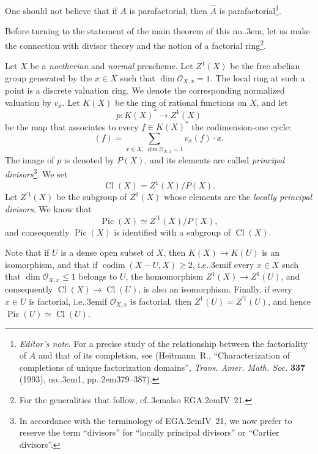 \documentclass[11pt,a4paper,oneside]{book}
\providecommand{\sisi}[2]{#2}
\providecommand{\pageoriginale}{%
  \refstepcounter{pageoriginal}%
  \marginpar{\raggedright\footnotesize\bfseries\thepageoriginal}%
  \xspace}
\providecommand{\nde}[1]{\footnote{\textit{Editor's note.} #1}}
\providecommand{\sfootnote}[1]{\footnote{#1}}
\providecommand{\og}{``}
\providecommand{\fg}{''\xspace}
\providecommand{\cf}{cf.\kern.3em}
\providecommand{\ie}{i.e.\kern.3em}
\providecommand{\EGA}{\textup{EGA}\kern.2em}
\providecommand{\ptbl}{.\kern.2em}
\providecommand{\numero}{no.\kern.3em}
\providecommand{\no}{no.\kern.3em}
\providecommand{\quoi}{}
\providecommand{\OXx}{\mathcal O_{X,x}}
\providecommand{\Pic}{\operatorname{Pic}}
\providecommand{\Cl}{\operatorname{Cl}}
\providecommand{\codim}{\operatorname{codim}}
\providecommand{\danger}{\marginpar{\Large$\triangle$}}
\theoremstyle{plain}
\theoremstyle{definition}
\theoremstyle{remark}
\begin{document}
One should not believe that if $A$ is parafactorial, then $\hat A$ is parafactorial\nde{For a precise study of the relationship between the factoriality of $A$ and that of its completion, see (Heitmann~R., {\og Characterization of completions of unique factorization domains\fg}, \emph{Trans. Amer. Math. Soc.} \textbf{337} (1993), \numero 1, pp\ptbl 379--387).}.

\danger

Before turning to the statement of the main theorem of this \no, let us make the connection with divisor theory and the notion of a factorial ring\sfootnote{For the generalities that follow, \cf also \EGA IV~21.}.

Let $X$ be a \emph{noetherian} and \emph{normal} prescheme. Let $Z^1(X)$ be the free abelian group generated by the $x\in X$ such that $\dim\OXx=1$. The local ring at such a point is a discrete valuation ring. We denote the corresponding normalized valuation by $v_x$. Let $K(X)$ be the ring of rational functions on $X$, and let
\[
p\colon K(X)^*\to Z^1(X)
\]
be the map that associates to every $f\in K(X)^*$ the codimension-one cycle:
\[
(f) = \sum_{x\in X, \;\dim\OXx=1} v_x(f)\cdot x{\quoi}.
\]
The image\pageoriginale of $p$ is denoted by $P(X)$, and its elements are called \emph{principal divisors}\sfootnote{In accordance with the terminology of \EGA IV~21, we now prefer to reserve the term \og divisors\fg for \og locally principal divisors\fg or \og Cartier divisors\fg.}. We set
\[
\Cl(X) = Z^1(X)/P(X){\quoi}.
\]
Let $\sisi{Z}{Z^{\prime1}(X)}$ be the subgroup of $Z^1(X)$ whose elements are the \emph{locally principal divisors}. We know that
\[
\Pic(X)\simeq Z^{\prime1}(X)/P(X){\quoi},
\]
and consequently $\Pic(X)$ is identified with a subgroup of $\Cl(X)$.

Note that if $U$ is a dense open subset of $X$, then $K(X)\to K(U)$ is an isomorphism, and that if $\codim(X-U, X)\geq 2$, \ie if every $x\in X$ such that $\dim\OXx\leq 1$ belongs to $U$, the homomorphism $Z^1(X)\to Z^1(U)$, and consequently $\Cl(X)\to\Cl(U)$, is also an isomorphism. Finally, if every $x\in U$ is factorial, \ie if $\OXx$ is factorial, then $Z^1(U) = Z^{\prime1}(U)$, and hence $\Pic(U)\simeq\Cl(U)$.
\end{document}
